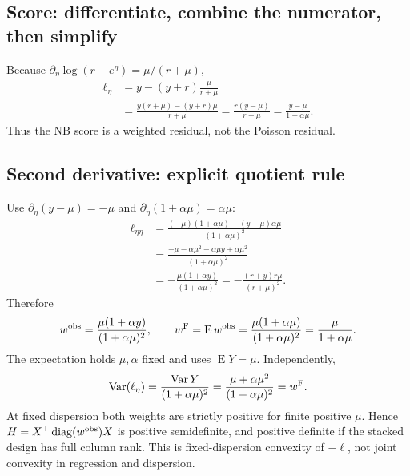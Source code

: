 \documentclass[11pt,a4paper]{article}
\newcommand{\E}{\operatorname{E}}
\newcommand{\Var}{\operatorname{Var}}
\newcommand{\diag}{\operatorname{diag}}
\numberwithin{equation}{section}
\begin{document}
\subsection{Score: differentiate, combine the numerator, then simplify}
Because $\partial_\eta\log(r+e^\eta)=\mu/(r+\mu)$,
\begin{align}
 \ell_\eta
 &=y-(y+r)\frac{\mu}{r+\mu}\\
 &=\frac{y(r+\mu)-(y+r)\mu}{r+\mu}
 =\frac{r(y-\mu)}{r+\mu}
 =\frac{y-\mu}{1+\alpha\mu}.
 \label{eq:nb-score-expanded}
\end{align}
Thus the NB score is a weighted residual, not the Poisson residual.

\subsection{Second derivative: explicit quotient rule}
Use $\partial_\eta(y-\mu)=-\mu$ and
$\partial_\eta(1+\alpha\mu)=\alpha\mu$:
\begin{align}
 \ell_{\eta\eta}
 &=\frac{(-\mu)(1+\alpha\mu)
          -(y-\mu)\alpha\mu}{(1+\alpha\mu)^2}\\
 &=\frac{-\mu-\alpha\mu^2-\alpha\mu y+\alpha\mu^2}
              {(1+\alpha\mu)^2}\\
 &=-\frac{\mu(1+\alpha y)}{(1+\alpha\mu)^2}
 =-\frac{(r+y)r\mu}{(r+\mu)^2}.
\end{align}
Therefore
\begin{equation}\label{eq:nb-weights}
 w^{\rm obs}=\frac{\mu(1+\alpha y)}{(1+\alpha\mu)^2},
 \qquad
 w^{\rm F}=\E w^{\rm obs}
 =\frac{\mu(1+\alpha\mu)}{(1+\alpha\mu)^2}
 =\frac{\mu}{1+\alpha\mu}.
\end{equation}
The expectation holds $\mu,\alpha$ fixed and uses $\E Y=\mu$.
Independently,
\[
 \Var(\ell_\eta)
 =\frac{\Var Y}{(1+\alpha\mu)^2}
 =\frac{\mu+\alpha\mu^2}{(1+\alpha\mu)^2}=w^{\rm F}.
\]
At fixed dispersion both weights are strictly positive for finite positive
$\mu$. Hence $H=X^\top\diag(w^{\rm obs})X$ is positive semidefinite,
and positive definite if the stacked design has full column rank.
This is fixed-dispersion convexity of $-\ell$, not joint convexity in
regression and dispersion.
\end{document}
